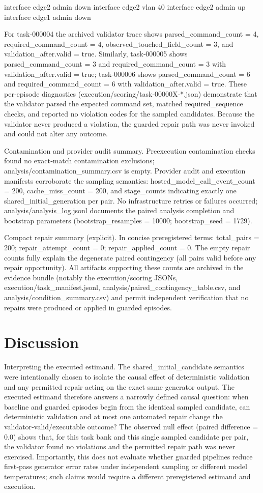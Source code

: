 \documentclass[conference]{IEEEtran}
\begin{document}
interface edge2 admin down
interface edge2 vlan 40
interface edge2 admin up
interface edge1 admin down

For task‑000004 the archived validator trace shows parsed\_command\_count = 4, required\_command\_count = 4, observed\_touched\_field\_count = 3, and validation\_after.valid = true. Similarly, task‑000005 shows parsed\_command\_count = 3 and required\_command\_count = 3 with validation\_after.valid = true; task‑000006 shows parsed\_command\_count = 6 and required\_command\_count = 6 with validation\_after.valid = true. These per‑episode diagnostics (execution/scoring/task‑00000X‑*.json) demonstrate that the validator parsed the expected command set, matched required\_sequence checks, and reported no violation codes for the sampled candidates. Because the validator never produced a violation, the guarded repair path was never invoked and could not alter any outcome.

Contamination and provider audit summary. Preexecution contamination checks found no exact‑match contamination exclusions; analysis/contamination\_summary.csv is empty. Provider audit and execution manifests corroborate the sampling semantics: hosted\_model\_call\_event\_count = 200, cache\_miss\_count = 200, and stage\_counts indicating exactly one shared\_initial\_generation per pair. No infrastructure retries or failures occurred; analysis/analysis\_log.jsonl documents the paired analysis completion and bootstrap parameters (bootstrap\_resamples = 10000; bootstrap\_seed = 1729).

Compact repair summary (explicit). In concise preregistered terms: total\_pairs = 200; repair\_attempt\_count = 0; repair\_applied\_count = 0. The empty repair counts fully explain the degenerate paired contingency (all pairs valid before any repair opportunity). All artifacts supporting these counts are archived in the evidence bundle (notably the execution/scoring JSONs, execution/task\_manifest.jsonl, analysis/paired\_contingency\_table.csv, and analysis/condition\_summary.csv) and permit independent verification that no repairs were produced or applied in guarded episodes.

\section{Discussion}
Interpreting the executed estimand. The shared\_initial\_candidate semantics were intentionally chosen to isolate the causal effect of deterministic validation and any permitted repair acting on the exact same generator output. The executed estimand therefore answers a narrowly defined causal question: when baseline and guarded episodes begin from the identical sampled candidate, can deterministic validation and at most one automated repair change the validator‑valid/executable outcome? The observed null effect (paired difference = 0.0) shows that, for this task bank and this single sampled candidate per pair, the validator found no violations and the permitted repair path was never exercised. Importantly, this does not evaluate whether guarded pipelines reduce first‑pass generator error rates under independent sampling or different model temperatures; such claims would require a different preregistered estimand and execution.
\end{document}
